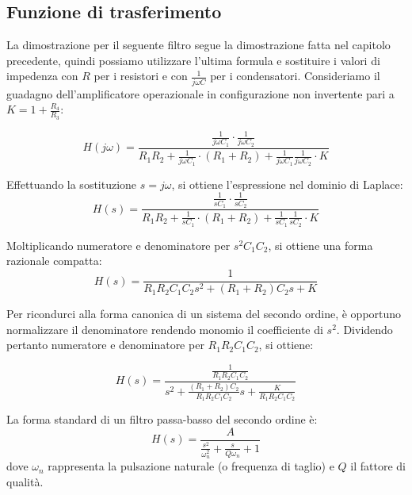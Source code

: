 \SallenKeyKLP

\subsection{Funzione di trasferimento}
La dimostrazione per il seguente filtro segue la dimostrazione fatta nel capitolo precedente, quindi possiamo utilizzare l'ultima formula e sostituire i valori di impedenza con $R$ per i resistori e con $\frac{1}{j\omega C}$ per i condensatori. Consideriamo il guadagno dell'amplificatore operazionale in configurazione non invertente pari a $K = 1 + \frac{R_4}{R_3}$:

\begin{equation}
        H(j\omega) = \frac{\frac{1}{j\omega C_1}\cdot \frac{1}{j\omega C_2}}{R_1R_2+\frac{1}{j\omega C_1}\cdot(R_1+R_2)+\frac{1}{j\omega C_1}\frac{1}{j\omega C_2}\cdot K} 
        \label{eq: FdT jw LPK}
\end{equation}

Effettuando la sostituzione $s = j\omega$, si ottiene l'espressione nel dominio di Laplace:
\begin{equation}
        H(s) = \frac{\frac{1}{s C_1}\cdot \frac{1}{s C_2}}{R_1R_2+\frac{1}{sC_1}\cdot(R_1+R_2)+\frac{1}{s C_1}\frac{1}{s C_2}\cdot K} 
        \label{eq: FdT s LPK K}
\end{equation}

Moltiplicando numeratore e denominatore per $s^2 C_1 C_2$, si ottiene una forma razionale compatta:
\begin{equation}
        H(s) = \frac{1}{R_1R_2 C_1 C_2 s^2 + (R_1+R_2)C_2 s + K} 
        \label{eq: FdT s LPK compatta}
\end{equation}

Per ricondurci alla forma canonica di un sistema del secondo ordine, è opportuno normalizzare il denominatore rendendo monomio il coefficiente di $s^2$. Dividendo pertanto numeratore e denominatore per $R_1R_2 C_1 C_2$, si ottiene:

\begin{equation}
        H(s) = \frac{\frac{1}{R_1R_2 C_1 C_2}}{s^2 + \frac{(R_1+R_2)C_2}{R_1R_2 C_1 C_2}s + \frac{K}{R_1R_2 C_1 C_2}} 
        \label{eq: FdT s LPK normalizzata}
\end{equation}

La forma standard di un filtro passa-basso del secondo ordine è:
\begin{equation}
    H(s) = \frac{A}{\frac{s^2}{\omega_n^2} + \frac{s}{Q\omega_n} + 1}
    \label{eq: FdT standard LP}
\end{equation}
dove $\omega_n$ rappresenta la pulsazione naturale (o frequenza di taglio) e $Q$ il fattore di qualità.

